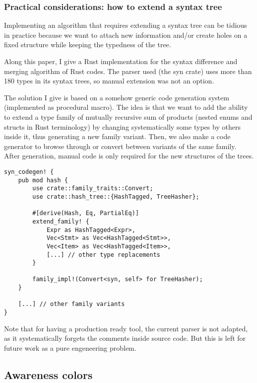 \documentclass[a4paper,10pt]{article}
\begin{document}
\subsubsection{Practical considerations: how to extend a syntax tree}
Implementing an algorithm that requires extending a syntax tree can be tidious in practice because we want to attach new information and/or create holes on a fixed structure while keeping the typedness of the tree.

Along this paper, I give a Rust implementation for the syntax difference and merging algorithm of Rust codes. The parser used (the syn crate) uses more than 180 types in its syntax trees, so manual extension was not an option.

The solution I give is based on a somehow generic code generation system (implemented as procedural macro). The idea is that we want to add the ability to extend a type family of mutually recursive sum of products (nested enums and structs in Rust terminology) by changing systematically some types by others inside it, thus generating a new family variant. Then, we also make a code generator to browse through or convert between variants of the same family. After generation, manual code is only required for the new structures of the trees.

\begin{lstlisting}[label=lst:codegen, caption={Usage example of the code generator for creating the hash-tagged family variant}]
syn_codegen! {
    pub mod hash {
        use crate::family_traits::Convert;
        use crate::hash_tree::{HashTagged, TreeHasher};

        #[derive(Hash, Eq, PartialEq)]
        extend_family! {
            Expr as HashTagged<Expr>,
            Vec<Stmt> as Vec<HashTagged<Stmt>>,
            Vec<Item> as Vec<HashTagged<Item>>,
            [...] // other type replacements
        }

        family_impl!(Convert<syn, self> for TreeHasher);
    }

    [...] // other family variants
}
\end{lstlisting}


Note that for having a production ready tool, the current parser is not adapted, as it systematically forgets the comments inside source code. But this is left for future work as a pure engeneering problem.

\subsection{Awareness colors}
\end{document}
